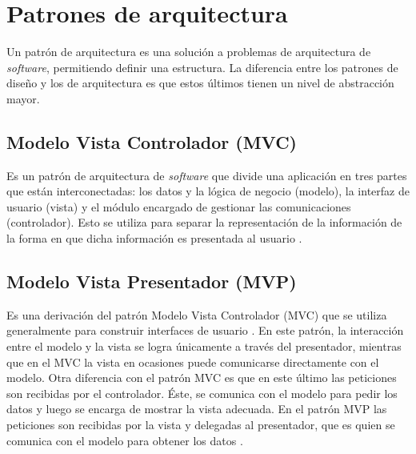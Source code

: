 \section{Patrones de arquitectura} \label{sect:Patrones de arquitectura}
Un patrón de arquitectura es una solución a problemas de arquitectura de \textit{software}, permitiendo definir una estructura. La diferencia entre los patrones de diseño y los de arquitectura es que estos últimos tienen un nivel de abstracción mayor. \cite{PDA1}

\subsection{Modelo Vista Controlador (MVC)}

Es un patrón de arquitectura de \textit{software} que divide una aplicación  en tres partes que están interconectadas: los datos y la lógica de negocio (modelo), la interfaz de usuario (vista) y el módulo encargado de gestionar las comunicaciones (controlador). Esto se utiliza para separar la representación de la información de la forma en que dicha información es presentada al usuario \cite{MVC0}.

\subsection{Modelo Vista Presentador (MVP)}

Es una derivación del patrón Modelo Vista Controlador (MVC) que se utiliza generalmente para construir interfaces de usuario \cite{MVP0}. En este patrón, la interacción entre el modelo y la vista se logra únicamente a través del presentador, mientras que en el MVC la vista en ocasiones puede comunicarse directamente con el modelo. Otra diferencia con el patrón MVC es que en este último las peticiones son recibidas por el controlador. Éste, se comunica con el modelo para pedir los datos y luego se encarga de mostrar la vista adecuada. En el patrón MVP las peticiones son recibidas por la vista y delegadas al presentador, que es quien se comunica con el modelo para obtener los datos \cite{MVP1}.